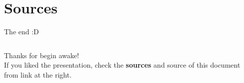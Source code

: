 \documentclass{beamer}
\begin{document}
\section{Sources}
\begin{frame} {The end :D}
  \begin{columns}
    Thanks for begin awake! \\
    If you liked the presentation, check the \textbf{sources} and source of this document from link at the right.
  \end{columns}
\end{frame}
\end{document}
